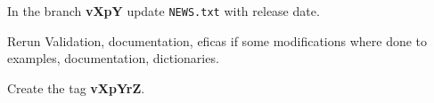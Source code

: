 \begin{todolist}
\setlength\itemsep{0.01em}
  \item In the branch \textbf{vXpY} update \verb!NEWS.txt! with release date.
  \item Rerun Validation, documentation, eficas if some modifications where
    done to examples, documentation, dictionaries.
  \item Create the tag \textbf{vXpYrZ}.
\end{todolist}
